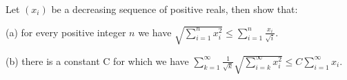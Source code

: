 Let $(x_i)$ be a decreasing sequence of positive reals, then show that:

(a) for every positive integer $n$ we have $\sqrt{\sum^n_{i=1}{x_i^2}} \leq \sum^n_{i=1}\frac{x_i}{\sqrt{i}}$.

(b) there is a constant C for which we have $\sum^{\infty}_{k=1}\frac{1}{\sqrt{k}}\sqrt{\sum^{\infty}_{i=k}x_i^2} \le C\sum^{\infty}_{i=1}x_i$.